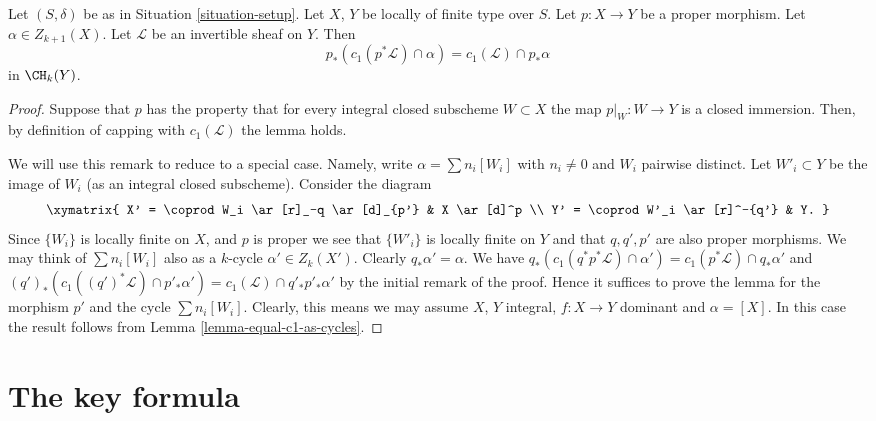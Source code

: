 \begin{lemma}
\label{lemma-pushforward-cap-c1}
Let $(S, \delta)$ be as in Situation \ref{situation-setup}.
Let $X$, $Y$ be locally of finite type over $S$.
Let $p : X \to Y$ be a proper morphism.
Let $\alpha \in Z_{k + 1}(X)$.
Let $\mathcal{L}$ be an invertible sheaf on $Y$.
Then
$$
p_*(c_1(p^*\mathcal{L}) \cap \alpha) = c_1(\mathcal{L}) \cap p_*\alpha
$$
in $\CH_k(Y)$.
\end{lemma}

\begin{proof}
Suppose that $p$ has the property that for every integral
closed subscheme $W \subset X$ the map $p|_W : W \to Y$
is a closed immersion. Then, by definition of capping
with $c_1(\mathcal{L})$ the lemma holds.

\medskip\noindent
We will use this remark to reduce to a special case. Namely,
write $\alpha = \sum n_i[W_i]$ with $n_i \not = 0$ and $W_i$ pairwise
distinct. Let $W'_i \subset Y$ be the image of $W_i$ (as an integral
closed subscheme). Consider the diagram
$$
\xymatrix{
X' = \coprod W_i \ar[r]_-q \ar[d]_{p'} & X \ar[d]^p \\
Y' = \coprod W'_i \ar[r]^-{q'} & Y.
}
$$
Since $\{W_i\}$ is locally finite on $X$, and $p$ is proper
we see that $\{W'_i\}$ is locally finite on $Y$ and that
$q, q', p'$ are also proper morphisms.
We may think of $\sum n_i[W_i]$ also as a $k$-cycle
$\alpha' \in Z_k(X')$. Clearly $q_*\alpha' = \alpha$.
We have
$q_*(c_1(q^*p^*\mathcal{L}) \cap \alpha')
= c_1(p^*\mathcal{L}) \cap q_*\alpha'$
and
$(q')_*(c_1((q')^*\mathcal{L}) \cap p'_*\alpha') =
c_1(\mathcal{L}) \cap q'_*p'_*\alpha'$ by the initial
remark of the proof. Hence it suffices to prove the lemma
for the morphism $p'$ and the cycle $\sum n_i[W_i]$.
Clearly, this means we may assume $X$, $Y$ integral,
$f : X \to Y$ dominant and $\alpha = [X]$.
In this case the result follows from
Lemma \ref{lemma-equal-c1-as-cycles}.
\end{proof}






\section{The key formula}
\label{section-key}


